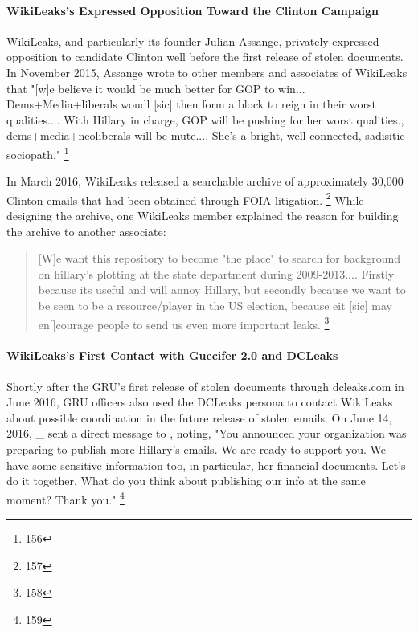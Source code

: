 \paragraph{WikiLeaks's Expressed Opposition Toward the Clinton Campaign}

WikiLeaks, and particularly its founder Julian Assange, privately expressed opposition to candidate Clinton well before the first release of stolen documents.
In November 2015, Assange wrote to other members and associates of WikiLeaks that "[w]e believe it would be much better for GOP to win...
Dems+Media+liberals woudl [sic] then form a block to reign in their worst qualities....
With Hillary in charge, GOP will be pushing for her worst qualities., dems+media+neoliberals will be mute....
She's a bright, well connected, sadisitic sociopath."%
\footnote{156}

In March 2016, WikiLeaks released a searchable archive of approximately 30,000 Clinton emails that had been obtained through FOIA litigation.%
\footnote{157}
While designing the archive, one WikiLeaks member explained the reason for building the archive to another associate:

\begin{quote}
[W]e want this repository to become "the place" to search for background on hillary's plotting at the state department during 2009-2013....
Firstly because its useful and will annoy Hillary, but secondly because we want to be seen to be a resource/player in the US election, because eit [sic] may en[]courage people to send us even more important leaks.%
\footnote{158}
\end{quote}

\paragraph{WikiLeaks's First Contact with Guccifer 2.0 and DCLeaks}

Shortly after the GRU's first release of stolen documents through dcleaks.com in June 2016, GRU officers also used the DCLeaks persona to contact WikiLeaks about possible coordination in the future release of stolen emails.
On June 14, 2016, \@dcleaks\_ sent a direct message to \@WikiLeaks, noting, "You announced your organization was preparing to publish more Hillary's emails.
We are ready to support you.
We have some sensitive information too, in particular, her financial documents.
Let's do it together.
What do you think about publishing our info at the same moment?
Thank you."%
\footnote{159}

